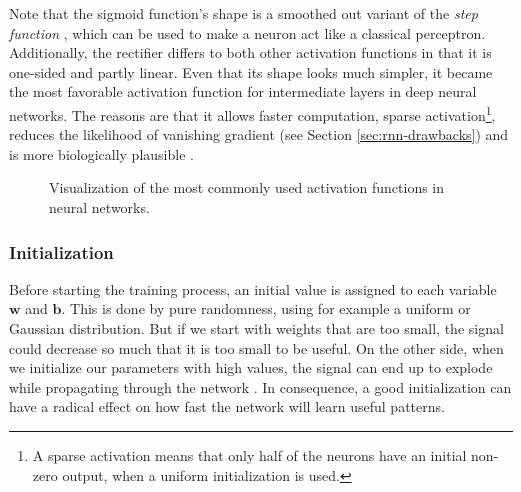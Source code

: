 Note that the sigmoid function's shape is a smoothed out variant of the \textit{step function} \parencite{neural_nets_deep_learning}, which can be used to make a neuron act like a classical perceptron. Additionally, the rectifier differs to both other activation functions in that it is one-sided and partly linear. Even that its shape looks much simpler, it became the most favorable activation function for intermediate layers in deep neural networks. The reasons are that it allows faster computation, sparse activation\footnote{{A sparse activation means that only half of the neurons have an initial non-zero output, when a uniform initialization is used.}}, reduces the likelihood of vanishing gradient (see Section \ref{sec:rnn-drawbacks}) and is more biologically plausible \parencite{relu}.

\begin{figure}[htpb]
  \centering
  \hspace*{-1.0cm}
  {
  }
  \caption[Activation Functions]{Visualization of the most commonly used activation functions in neural networks.}\label{fig:activations}
\end{figure}

\subsubsection{Initialization}

Before starting the training process, an initial value is assigned to each variable $ \textbf{w} $ and $ \textbf{b} $. This is done by pure randomness, using for example a uniform or Gaussian distribution. But if we start with weights that are too small, the signal could decrease so much that it is too small to be useful. On the other side, when we initialize our parameters with high values, the signal can end up to explode while propagating through the network \parencite{understand_xavier}. In consequence, a good initialization can have a radical effect on how fast the network will learn useful patterns.

